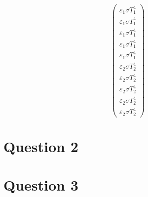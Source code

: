 \begin{equation}
 \begin{pmatrix}
 \varepsilon_1 \sigma T_1^4\\
 \varepsilon_1 \sigma T_1^4\\
 \varepsilon_1 \sigma T_1^4\\
 \varepsilon_1 \sigma T_1^4\\
 \varepsilon_1 \sigma T_1^4\\
 \varepsilon_2 \sigma T_2^4\\
 \varepsilon_2 \sigma T_2^4\\
 \varepsilon_2 \sigma T_2^4\\
 \varepsilon_2 \sigma T_2^4\\
 \varepsilon_2 \sigma T_2^4
 \end{pmatrix}
\end{equation}



\section*{Question 2}
\section*{Question 3}

